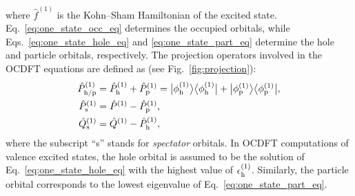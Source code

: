 \documentclass[8.5pt,twoside,twocolumn]{article}
\newcommand{\bra}[2][0]
{\ifthenelse{\equal{#1}{0}}{\left\langle #2 \right|}
{\ifthenelse{\equal{#1}{1}}{\big\langle #2 \big|}
{\ifthenelse{\equal{#1}{2}}{\Big\langle #2 \Big|}
{\ifthenelse{\equal{#1}{3}}{\bigg\langle #2 \bigg|}
{\ifthenelse{\equal{#1}{4}}{\Bigg\langle #2 \Bigg|}
{Error}}}}}
}
\newcommand{\ket}[2][0]
{\ifthenelse{\equal{#1}{0}}{\left| #2 \right\rangle}
{\ifthenelse{\equal{#1}{1}}{\big| #2 \big\rangle}
{\ifthenelse{\equal{#1}{2}}{\Big| #2 \Big\rangle}
{\ifthenelse{\equal{#1}{3}}{\bigg| #2 \bigg\rangle}
{\ifthenelse{\equal{#1}{4}}{\Bigg| #2 \Bigg\rangle}
{Error}}}}}
}
\begin{document}
where $\hat{f}^{(1)} $ is the Kohn--Sham Hamiltonian of the excited state.
Eq.~\eqref{eq:one_state_occ_eq} determines the occupied orbitals, while Eqs.~\eqref{eq:one_state_hole_eq} and \eqref{eq:one_state_part_eq} determine the hole and particle orbitals, respectively.
The projection operators involved in the OCDFT equations are defined as (see Fig.~\ref{fig:projection}):
\begin{align}
\hat{P}^{(1)}_{\rm h/p} &= \hat{P}^{(1)}_{\rm h} + \hat{P}^{(1)}_{\rm p} = 
\ket[1]{\phi^{(1)}_{\rm h}}\bra[1]{\phi^{(1)}_{\rm h}}
+\ket[1]{\phi^{(1)}_{\rm p}}\bra[1]{\phi^{(1)}_{\rm p}},\\
\hat{P}^{(1)}_{\rm s} &= \hat{P}^{(1)} - \hat{P}^{(1)}_{\rm p},\\
\hat{Q}^{(1)}_{\rm s} &= \hat{Q}^{(1)} - \hat{P}^{(1)}_{\rm h},
\end{align}
where the subscript ``s'' stands for \textit{spectator} orbitals.
In OCDFT computations of valence excited states, the hole orbital is assumed to be the solution of Eq.~\eqref{eq:one_state_hole_eq} with the highest value of $\epsilon^{(1)}_{\rm h}$.  Similarly, the particle orbital corresponds to the lowest eigenvalue of Eq.~\eqref{eq:one_state_part_eq}.
\end{document}
